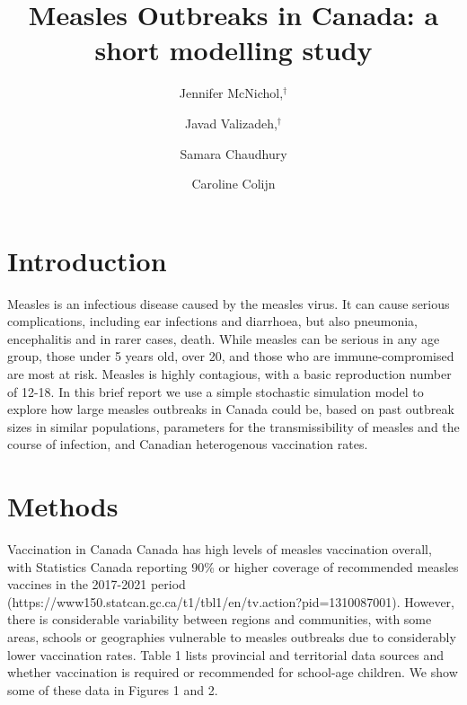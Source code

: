 \documentclass[12pt,a4paper]{article}
\begin{document}
\title{Measles Outbreaks in Canada: a short modelling study
}


\author[1]{Jennifer McNichol,$^\dag$}
\author[1]{Javad Valizadeh,$^\dag$}
\author[1]{Samara Chaudhury}
\author[1,*]{Caroline Colijn}


\maketitle

\section{Introduction}

Measles is an infectious disease caused by the measles virus. It can cause serious complications, including ear infections and diarrhoea, but also pneumonia, encephalitis and in rarer cases, death. While measles can be serious in any age group, those under 5 years old, over 20, and those who are immune-compromised are most at risk. Measles is highly contagious, with a basic reproduction number of 12-18.
In this brief report we use a simple stochastic simulation model to explore how large measles outbreaks in Canada could be, based on past outbreak sizes in similar populations, parameters for the transmissibility of measles and the course of infection, and Canadian heterogenous vaccination rates.

\section{Methods}
Vaccination in Canada
Canada has high levels of measles vaccination overall, with Statistics Canada reporting 90\% or higher coverage of recommended measles vaccines in the 2017-2021 period (https://www150.statcan.gc.ca/t1/tbl1/en/tv.action?pid=1310087001). However, there is considerable variability between regions and communities, with some areas, schools or geographies vulnerable to measles outbreaks due to considerably lower vaccination rates. Table 1 lists provincial and territorial data sources and whether vaccination is required or recommended for school-age children. We show some of these data in Figures 1 and 2.
\end{document}

